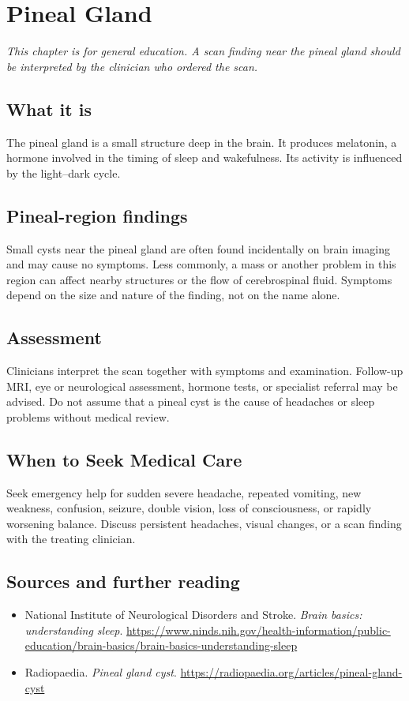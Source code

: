 \chapter{Pineal Gland}

\medskip
\noindent\textit{This chapter is for general education. A scan finding near the pineal gland should be interpreted by the clinician who ordered the scan.}

\section*{What it is}
The pineal gland is a small structure deep in the brain. It produces melatonin, a hormone involved in the timing of sleep and wakefulness. Its activity is influenced by the light--dark cycle.

\section*{Pineal-region findings}
Small cysts near the pineal gland are often found incidentally on brain imaging and may cause no symptoms. Less commonly, a mass or another problem in this region can affect nearby structures or the flow of cerebrospinal fluid. Symptoms depend on the size and nature of the finding, not on the name alone.

\section*{Assessment}
Clinicians interpret the scan together with symptoms and examination. Follow-up MRI, eye or neurological assessment, hormone tests, or specialist referral may be advised. Do not assume that a pineal cyst is the cause of headaches or sleep problems without medical review.

\section*{When to Seek Medical Care}
Seek emergency help for sudden severe headache, repeated vomiting, new weakness, confusion, seizure, double vision, loss of consciousness, or rapidly worsening balance. Discuss persistent headaches, visual changes, or a scan finding with the treating clinician.

\section*{Sources and further reading}
\begin{itemize}
\item National Institute of Neurological Disorders and Stroke. \textit{Brain basics: understanding sleep}. \url{https://www.ninds.nih.gov/health-information/public-education/brain-basics/brain-basics-understanding-sleep}
\item Radiopaedia. \textit{Pineal gland cyst}. \url{https://radiopaedia.org/articles/pineal-gland-cyst}
\end{itemize}
